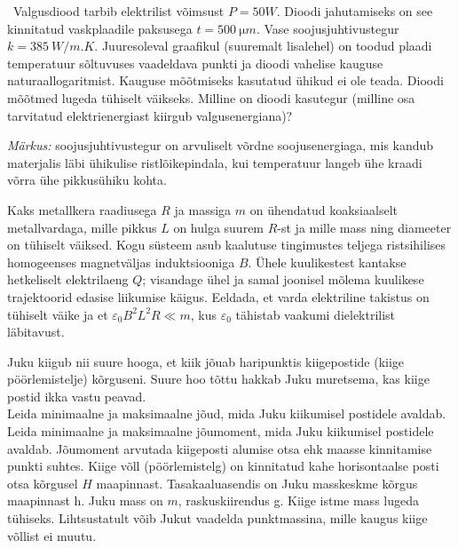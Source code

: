 \documentclass[10pt]{article}
\begin{document}
\
Valgusdiood tarbib elektrilist võimsust $P=\SI{50}W$. Dioodi jahutamiseks on see kinnitatud vaskplaadile paksusega $t=\SI{500}{\micro m}$. Vase soojusjuhtivustegur $k=\SI{385}{W/m.K}$. Juuresoleval graafikul (suuremalt lisalehel) on toodud plaadi temperatuur sõltuvuses vaadeldava punkti ja dioodi vahelise kauguse naturaallogaritmist. Kauguse mõõtmiseks kasutatud ühikud ei ole teada. Dioodi mõõtmed lugeda tühiselt väikseks. Milline on dioodi kasutegur (milline osa tarvitatud elektrienergiast kiirgub valgusenergiana)?

\textit{Märkus:} soojusjuhtivustegur on arvuliselt võrdne soojusenergiaga, mis kandub materjalis läbi ühikulise ristlõikepindala, kui temperatuur langeb ühe kraadi võrra ühe pikkusühiku kohta.
\probend
\bigskip


Kaks metallkera raadiusega $R$ ja massiga $m$ on ühendatud koaksiaalselt metallvardaga, mille pikkus $L$ on hulga suurem $R$-st ja mille mass ning diameeter on tühiselt väiksed. Kogu süsteem asub kaalutuse tingimustes teljega ristsihilises homogeenses magnetväljas induktsiooniga $B$. Ühele kuulikestest kantakse hetkeliselt elektrilaeng $Q$; visandage ühel ja samal joonisel mõlema kuulikese trajektoorid edasise liikumise käigus. Eeldada, et varda elektriline takistus on tühiselt väike ja et $\varepsilon_0B^2L^2R\ll m$, kus $\varepsilon_0$ tähistab vaakumi dielektrilist läbitavust.
\probend
\bigskip

\setAuthor{}

Juku kiigub  nii suure hooga, et kiik jõuab haripunktis kiigepostide (kiige pöörlemistelje) kõrguseni. Suure hoo tõttu hakkab Juku muretsema, kas kiige postid ikka vastu peavad.\\
\osa Leida minimaalne ja maksimaalne jõud, mida Juku kiikumisel postidele avaldab.\\
\osa Leida minimaalne ja maksimaalne jõumoment, mida Juku kiikumisel postidele avaldab. Jõumoment arvutada kiigeposti alumise otsa ehk maasse kinnitamise punkti suhtes.
Kiige võll (pöörlemistelg) on kinnitatud kahe horisontaalse posti otsa kõrgusel $H$ maapinnast. Tasakaaluasendis on Juku masskeskme kõrgus maapinnast h. Juku mass on $m$, raskuskiirendus g. Kiige istme mass lugeda tühiseks. Lihtsustatult võib Jukut vaadelda punktmassina, mille kaugus kiige võllist ei muutu.
\probend
\bigskip
\end{document}
